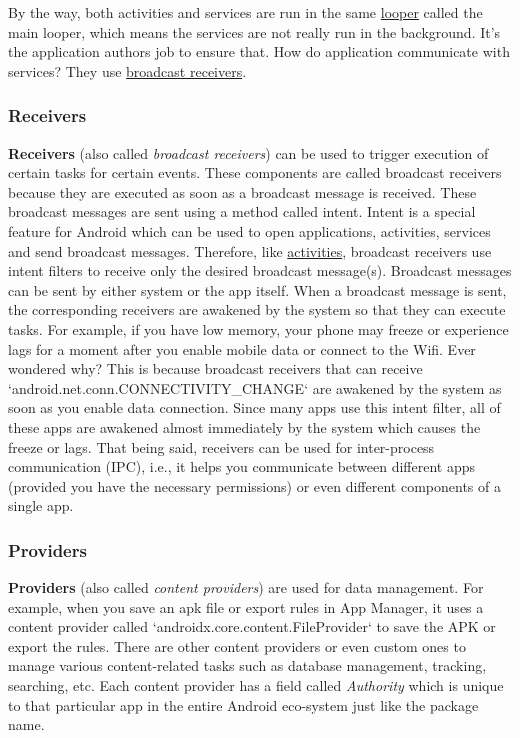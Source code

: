 By the way, both activities and services are run in the same \href{https://stackoverflow.com/questions/7597742}{looper}
called the main looper, which means the services are not really run in the background. It's the application authors job
to ensure that. How do application communicate with services? They use
\hyperref[subsubsec:app-details-receivers]{broadcast receivers}.

\subsubsection{Receivers}\label{subsubsec:app-details-receivers} %
\textbf{Receivers} (also called \textit{broadcast receivers}) can be used to trigger execution of certain tasks for
certain events. These components are called broadcast receivers because they are executed as soon as a broadcast message
is received. These broadcast messages are sent using a method called intent. Intent is a special feature for Android
which can be used to open applications, activities, services and send broadcast messages. Therefore, like
\hyperref[subsubsec:activities]{activities}, broadcast receivers use intent filters to receive only the desired
broadcast message(s). Broadcast messages can be sent by either system or the app itself. When a broadcast message is
sent, the corresponding receivers are awakened by the system so that they can execute tasks. For example, if you have
low memory, your phone may freeze or experience lags for a moment after you enable mobile data or connect to the Wifi.
Ever wondered why? This is because broadcast receivers that can receive `android.net.conn.CONNECTIVITY\_CHANGE` are
awakened by the system as soon as you enable data connection. Since many apps use this intent filter, all of these apps
are awakened almost immediately by the system which causes the freeze or lags. That being said, receivers can be used
for inter-process communication (IPC), i.e., it helps you communicate between different apps (provided you have the
necessary permissions) or even different components of a single app.

\subsubsection{Providers}\label{appdetails:providers} %
\textbf{Providers} (also called \textit{content providers}) are used for data management. For example, when you save an
apk file or export rules in App Manager, it uses a content provider called `androidx.core.content.FileProvider` to save
the APK or export the rules. There are other content providers or even custom ones to manage various content-related
tasks such as database management, tracking, searching, etc. Each content provider has a field called \textit{Authority}
which is unique to that particular app in the entire Android eco-system just like the package name.

